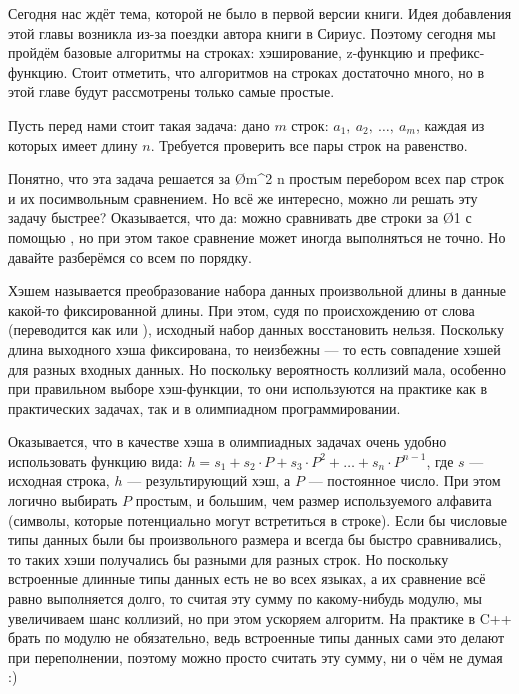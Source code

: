 Сегодня нас ждёт тема, которой не было в первой версии книги. Идея добавления этой главы возникла из-за поездки автора книги в Сириус. Поэтому сегодня мы пройдём базовые алгоритмы на строках: хэширование, z-функцию и префикс-функцию. Стоит отметить, что алгоритмов на строках достаточно много, но в этой главе будут рассмотрены только самые простые.


Пусть перед нами стоит такая задача: дано $m$ строк: $a_1,\ a_2,\ \ldots,\ a_m$, каждая из которых имеет длину $n$. Требуется проверить все пары строк на равенство.

Понятно, что эта задача решается за \O{m^2 \cdot n} простым перебором всех пар строк и их посимвольным сравнением. Но всё же интересно, можно ли решать эту задачу быстрее? Оказывается, что да: можно сравнивать две строки за \O{1} с помощью , но при этом такое сравнение может иногда выполняться не точно. Но давайте разберёмся со всем по порядку.

Хэшем называется преобразование набора данных произвольной длины в данные какой-то фиксированной длины. При этом, судя по происхождению от слова  (переводится как  или ), исходный набор данных восстановить нельзя. Поскольку длина выходного хэша фиксирована, то неизбежны  — то есть совпадение хэшей для разных входных данных. Но поскольку вероятность коллизий мала, особенно при правильном выборе хэш-функции, то они используются на практике как в практических задачах, так и в олимпиадном программировании.

Оказывается, что в качестве хэша в олимпиадных задачах очень удобно использовать функцию вида: $h = s_1 + s_2 \cdot P + s_3 \cdot P^2 + \ldots + s_n \cdot P^{n - 1}$, где $s$ — исходная строка, $h$ — результирующий хэш, а $P$ — постоянное число. При этом логично выбирать $P$ простым, и большим, чем размер используемого алфавита (символы, которые потенциально могут встретиться в строке). Если бы числовые типы данных были бы произвольного размера и всегда бы быстро сравнивались, то таких хэши получались бы разными для разных строк. Но поскольку встроенные длинные типы данных есть не во всех языках, а их сравнение всё равно выполняется долго, то считая эту сумму по какому-нибудь модулю, мы увеличиваем шанс коллизий, но при этом ускоряем алгоритм. На практике в C++ брать по модулю не обязательно, ведь встроенные типы данных сами это делают при переполнении, поэтому можно просто считать эту сумму, ни о чём не думая :)



